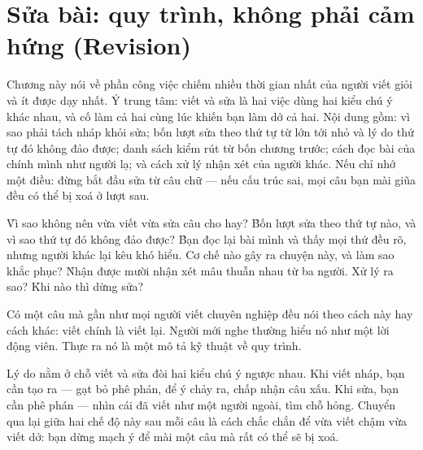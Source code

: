 \documentclass[../../english.tex]{subfiles}
\begin{document}
\chapter{Sửa bài: quy trình, không phải cảm hứng (Revision)}

\begin{tomtat}
Chương này nói về phần công việc chiếm nhiều thời gian nhất của người viết giỏi và ít được dạy nhất. Ý trung tâm: viết và sửa là hai việc dùng hai kiểu chú ý khác nhau, và cố làm cả hai cùng lúc khiến bạn làm dở cả hai. Nội dung gồm: vì sao phải tách nháp khỏi sửa; bốn lượt sửa theo thứ tự từ lớn tới nhỏ và lý do thứ tự đó không đảo được; danh sách kiểm rút từ bốn chương trước; cách đọc bài của chính mình như người lạ; và cách xử lý nhận xét của người khác. Nếu chỉ nhớ một điều: đừng bắt đầu sửa từ câu chữ --- nếu cấu trúc sai, mọi câu bạn mài giũa đều có thể bị xoá ở lượt sau.
\end{tomtat}

\begin{nentang}
\end{nentang}

\begin{khoigoi}
\h{Vì sao không nên vừa viết vừa sửa câu cho hay?}
\h{Bốn lượt sửa theo thứ tự nào, và vì sao thứ tự đó không đảo được?}
\h{Bạn đọc lại bài mình và thấy mọi thứ đều rõ, nhưng người khác lại kêu khó hiểu. Cơ chế nào gây ra chuyện này, và làm sao khắc phục?}
\h{Nhận được mười nhận xét mâu thuẫn nhau từ ba người. Xử lý ra sao?}
\h{Khi nào thì dừng sửa?}
\end{khoigoi}

Có một câu mà gần như mọi người viết chuyên nghiệp đều nói theo cách này hay cách khác: viết chính là viết lại. Người mới nghe thường hiểu nó như một lời động viên. Thực ra nó là một mô tả kỹ thuật về quy trình.

Lý do nằm ở chỗ viết và sửa đòi hai kiểu chú ý ngược nhau. Khi viết nháp, bạn cần tạo ra --- gạt bỏ phê phán, để ý chảy ra, chấp nhận câu xấu. Khi sửa, bạn cần phê phán --- nhìn cái đã viết như một người ngoài, tìm chỗ hỏng. Chuyển qua lại giữa hai chế độ này sau mỗi câu là cách chắc chắn để vừa viết chậm vừa viết dở: bạn dừng mạch ý để mài một câu mà rất có thể sẽ bị xoá.
\end{document}
